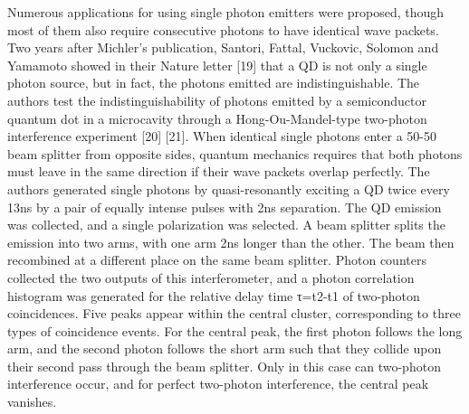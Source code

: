 Numerous applications for using single photon emitters were proposed, though most of them also require consecutive photons to have identical wave packets. Two years after Michler’s publication, Santori, Fattal, Vuckovic, Solomon and Yamamoto showed in their Nature letter [19] that a QD is not only a single photon source, but in fact, the photons emitted are indistinguishable. The authors test the indistinguishability of photons emitted by a semiconductor quantum dot in a microcavity through a Hong-Ou-Mandel-type two-photon interference experiment [20] [21]. When identical single photons enter a 50-50 beam splitter from opposite sides, quantum mechanics requires that both photons must leave in the same direction if their wave packets overlap perfectly. The authors generated single photons by quasi-resonantly exciting a QD twice every 13ns by a pair of equally intense pulses with 2ns separation. The QD emission was collected, and a single polarization was selected. A beam splitter splits the emission into two arms, with one arm 2ns longer than the other. The beam then recombined at a different place on the same beam splitter. Photon counters collected the two outputs of this interferometer, and a photon correlation histogram was generated for the relative delay time τ=t2-t1 of two-photon coincidences. Five peaks appear within the central cluster, corresponding to three types of coincidence events. For the central peak, the first photon follows the long arm, and the second photon follows the short arm such that they collide upon their second pass through the beam splitter. Only in this case can two-photon interference occur, and for perfect two-photon interference, the central peak vanishes.
